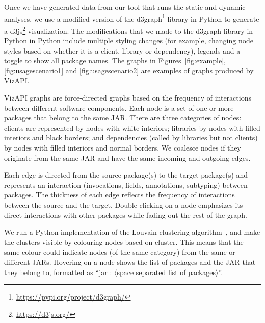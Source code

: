 Once we have generated data from our tool that runs the static and dynamic analyses, we use a modified version
of the d3graph\footnote{\url{https://pypi.org/project/d3graph/}} library in Python to generate a d3js\footnote{\url{https://d3js.org/}}
visualization. The modifications that we made to the d3graph  library in Python in Python include multiple styling changes (for example, changing node styles based on whether it is a client, library or dependency),
legends and a toggle to show all package names. 
The graphs in Figures~\ref{fig:example}, \ref{fig:usagescenario1} and \ref{fig:usagescenario2} are examples of graphs produced by VizAPI.

VizAPI graphs are force-directed graphs based on the frequency of
interactions between different software components.  Each node is a
set of one or more packages that belong to the same JAR.  There are
three categories of nodes: clients are represented by nodes with white
interiors; libraries by nodes with filled interiors and black borders;
and dependencies (called by libraries but not clients) by nodes with
filled interiors and normal borders.  We coalesce nodes if they
originate from the same JAR and have the same incoming and
outgoing edges.

Each edge is directed
from the source package(s) to the target package(s) and represents an interaction 
(invocations, fields, annotations, subtyping) between packages. 
The thickness of each edge reflects the frequency of interactions between the source and the target.
Double-clicking on a node emphasizes its direct interactions with other packages while fading out the rest of the graph.

We run a Python implementation of the Louvain clustering algorithm~\cite{blondel2008fast}, and make the clusters 
visible by colouring nodes based on cluster.
This means that the same colour could indicate nodes (of the same category) from the same or different JARs.
Hovering on a node shows the list of packages and 
the JAR that they belong to, 
formatted as “jar : $\langle$space separated list of packages$\rangle$”. 
